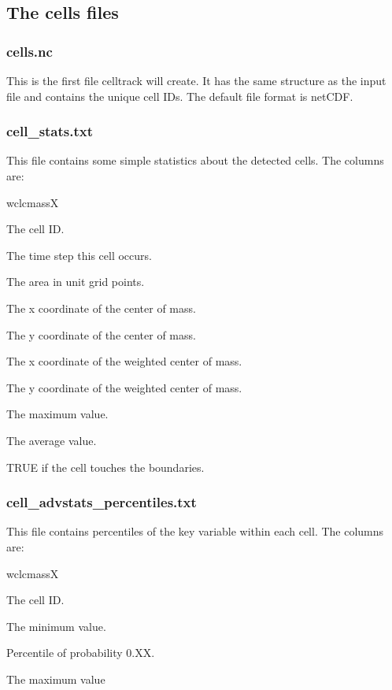\documentclass{scrartcl}
\begin{document}
\subsection{The cells files}
\subsubsection{cells.nc}
This is the first file celltrack will create. It has the same structure as the input file and contains the unique cell IDs. The default file format is netCDF.

\subsubsection{cell\_stats.txt}
This file contains some simple statistics about the detected cells. The columns are:
\begin{labeling}{wclcmassX}
	\item[clID] The cell ID.
	\item[tsclID] The time step this cell occurs.
	\item[clarea] The area in unit grid points.
	\item[clcmassX] The x coordinate of the center of mass.
	\item[clcmassY] The y coordinate of the center of mass.
	\item[wclcmassX] The x coordinate of the weighted center of mass.
	\item[wclcmassY] The y coordinate of the weighted center of mass.
	\item[peakVal] The maximum value.
	\item[avVal] The average value.
	\item[touchb] TRUE if the cell touches the boundaries.
\end{labeling}

\subsubsection{cell\_advstats\_percentiles.txt}
This file contains percentiles of the key variable within each cell. The columns are:
\begin{labeling}{wclcmassX}
	\item[clID] The cell ID.
	\item[MIN] The minimum value.
	\item[0.XX] Percentile of probability 0.XX.
	\item[MAX] The maximum value
\end{labeling}
\end{document}

